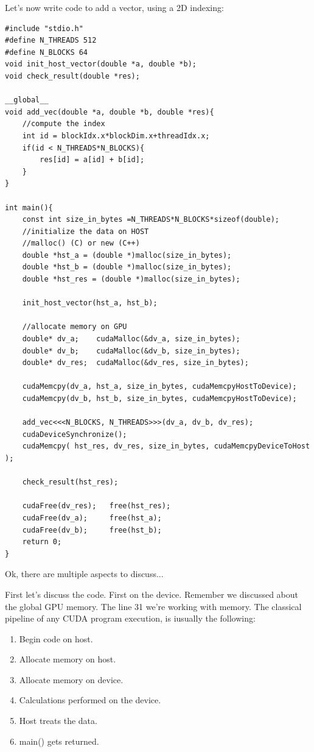 \documentclass[12pt]{article}
\begin{document}
Let's now write code to add a vector, using a 2D indexing: 

\begin{verbatim}
#include "stdio.h"
#define N_THREADS 512
#define N_BLOCKS 64 
void init_host_vector(double *a, double *b);
void check_result(double *res);

__global__ 
void add_vec(double *a, double *b, double *res){
    //compute the index
    int id = blockIdx.x*blockDim.x+threadIdx.x;
    if(id < N_THREADS*N_BLOCKS){
        res[id] = a[id] + b[id];
    }
}

int main(){
    const int size_in_bytes =N_THREADS*N_BLOCKS*sizeof(double);
    //initialize the data on HOST
    //malloc() (C) or new (C++) 
    double *hst_a = (double *)malloc(size_in_bytes);
    double *hst_b = (double *)malloc(size_in_bytes);
    double *hst_res = (double *)malloc(size_in_bytes);

    init_host_vector(hst_a, hst_b);

    //allocate memory on GPU
    double* dv_a;    cudaMalloc(&dv_a, size_in_bytes);
    double* dv_b;    cudaMalloc(&dv_b, size_in_bytes);
    double* dv_res;  cudaMalloc(&dv_res, size_in_bytes);

    cudaMemcpy(dv_a, hst_a, size_in_bytes, cudaMemcpyHostToDevice);
    cudaMemcpy(dv_b, hst_b, size_in_bytes, cudaMemcpyHostToDevice);

    add_vec<<<N_BLOCKS, N_THREADS>>>(dv_a, dv_b, dv_res);
    cudaDeviceSynchronize();
    cudaMemcpy( hst_res, dv_res, size_in_bytes, cudaMemcpyDeviceToHost );

    check_result(hst_res);

    cudaFree(dv_res);   free(hst_res);
    cudaFree(dv_a);     free(hst_a);  
    cudaFree(dv_b);     free(hst_b);
    return 0;
}
\end{verbatim}

Ok, there are multiple aspects to discuss...

First let's discuss the code. First on the device. Remember we discussed about the global GPU memory. 
The line 31 we're working with memory. The classical pipeline of any CUDA program
execution, is iusually the following:

\begin{enumerate}
\setlength\itemsep{-0.5em}
   \item Begin code on host.
   \item Allocate memory on host.
   \item Allocate memory on device.
   \item Calculations performed on the device.
   \item Host treats the data.
   \item main() gets returned.
\end{enumerate} 
\end{document}
